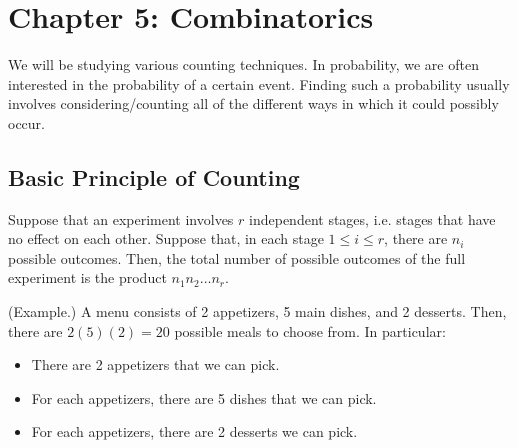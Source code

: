 \documentclass[letterpaper]{article}
\begin{document}
\section{Chapter 5: Combinatorics}
We will be studying various counting techniques. In probability, we are often interested in the probability of a certain event. Finding such a probability usually involves considering/counting all of the different ways in which it could possibly occur. 

\subsection{Basic Principle of Counting}
Suppose that an experiment involves $r$ independent stages, i.e. stages that have no effect on each other. Suppose that, in each stage $1 \leq i \leq r$, there are $n_i$ possible outcomes. Then, the total number of possible outcomes of the full experiment is the product $n_1 n_2 \dots n_r$. 

\begin{mdframed}[]
    (Example.) A menu consists of 2 appetizers, 5 main dishes, and 2 desserts. Then, there are $2(5)(2) = 20$ possible meals to choose from. In particular: 
    \begin{itemize}
        \item There are 2 appetizers that we can pick. 
        \item For each appetizers, there are 5 dishes that we can pick.
        \item For each appetizers, there are 2 desserts we can pick. 
    \end{itemize}
\end{mdframed}
\end{document}
